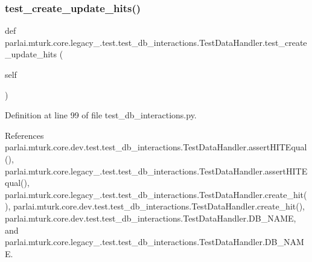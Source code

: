 \subsubsection{\texorpdfstring{test\+\_\+create\+\_\+update\+\_\+hits()}{test\_create\_update\_hits()}}
{\footnotesize\ttfamily def parlai.\+mturk.\+core.\+legacy\+\_.\+test.\+test\+\_\+db\+\_\+interactions.\+Test\+Data\+Handler.\+test\+\_\+create\+\_\+update\+\_\+hits (\begin{DoxyParamCaption}\item[{}]{self }\end{DoxyParamCaption})}



Definition at line 99 of file test\+\_\+db\+\_\+interactions.\+py.



References parlai.\+mturk.\+core.\+dev.\+test.\+test\+\_\+db\+\_\+interactions.\+Test\+Data\+Handler.\+assert\+H\+I\+T\+Equal(), parlai.\+mturk.\+core.\+legacy\+\_.\+test.\+test\+\_\+db\+\_\+interactions.\+Test\+Data\+Handler.\+assert\+H\+I\+T\+Equal(), parlai.\+mturk.\+core.\+legacy\+\_.\+test.\+test\+\_\+db\+\_\+interactions.\+Test\+Data\+Handler.\+create\+\_\+hit(), parlai.\+mturk.\+core.\+dev.\+test.\+test\+\_\+db\+\_\+interactions.\+Test\+Data\+Handler.\+create\+\_\+hit(), parlai.\+mturk.\+core.\+dev.\+test.\+test\+\_\+db\+\_\+interactions.\+Test\+Data\+Handler.\+D\+B\+\_\+\+N\+A\+ME, and parlai.\+mturk.\+core.\+legacy\+\_.\+test.\+test\+\_\+db\+\_\+interactions.\+Test\+Data\+Handler.\+D\+B\+\_\+\+N\+A\+ME.

